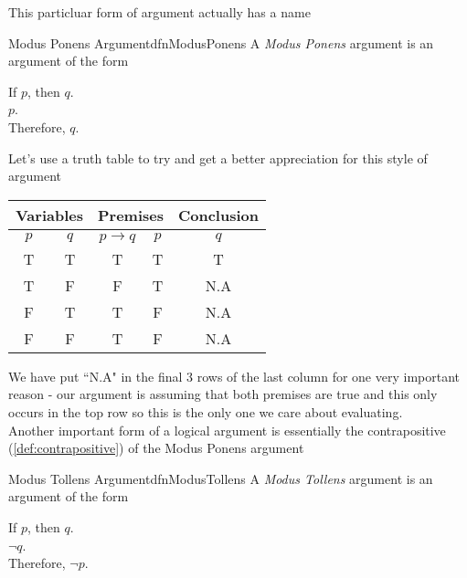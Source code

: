 This particluar form of argument actually has a name

\begin{dfn}[label={def:modusPonens}]{Modus Ponens Argument}{dfnModusPonens}
    A \emph{Modus Ponens} argument is an argument of the form
    \begin{center}
        If $p$, then $q$.\\
        $p$.\\
        Therefore, $q$.
    \end{center}
\end{dfn}

Let's use a truth table to try and get a better appreciation for this style of argument

\begin{center}
    \begin{tabular}{|c|c|c|c|c|}
        \hline
        \multicolumn{2}{|c|}{Variables} & \multicolumn{2}{|c|}{Premises} & Conclusion             \\
        \hline
        $p$                             & $q$                            & $p \to q$  & $p$ & $q$ \\
        \hline
        T                               & T                              & T          & T   & T   \\
        \hline
        T                               & F                              & F          & T   & N.A \\
        \hline
        F                               & T                              & T          & F   & N.A \\
        \hline
        F                               & F                              & T          & F   & N.A \\
        \hline
    \end{tabular}
\end{center}

We have put ``N.A" in the final 3 rows of the last column for one very important reason - our argument is assuming that both premises are true and this only occurs in the top row so this is the only one we care about evaluating.\\

Another important form of a logical argument is essentially the contrapositive (\cref{def:contrapositive}) of the Modus Ponens argument

\begin{dfn}[label={def:modusTollens}]{Modus Tollens Argument}{dfnModusTollens}
    A \emph{Modus Tollens} argument is an argument of the form
    \begin{center}
        If $p$, then $q$.\\
        $\lnot q$.\\
        Therefore, $\lnot p$.
    \end{center}
\end{dfn}

